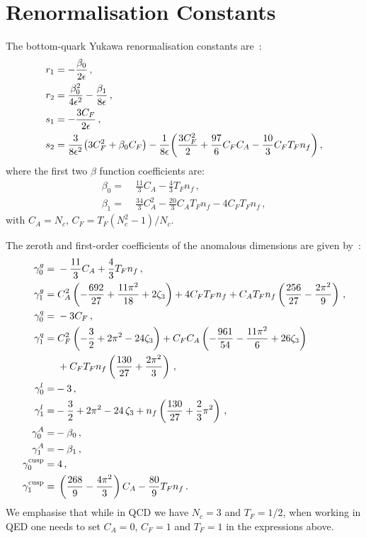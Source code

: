 \documentclass[main.tex]{subfiles}
\begin{document}
\chapter{Renormalisation Constants} \label{app:renormconstants}
The bottom-quark Yukawa renormalisation constants are~\cite{Ahmed:2014pka,Mondini:2021nck}:
\begin{align}
r_1 & = -\frac{\beta_0}{2\epsilon}\,, \\
r_2 & = \frac{\beta_0^2}{4\epsilon^2} - \frac{\beta_1}{8\epsilon}\,, \\
s_1 & = -\frac{3 C_F}{2\epsilon} \,, \\
s_2 & = \frac{3}{8\epsilon^2}\big(3 C_F^2 + \beta_0 C_F \big) - \frac{1}{8\epsilon} \bigg( \frac{3 C_F^2}{2} + \frac{97}{6} C_F C_A -\frac{10}{3} C_F T_F n_f   \bigg) \,,
\end{align}
where the first two $\beta$ function coefficients are:
\begin{align}
    \beta_0 = & \;\frac{11}{3}C_A - \frac{4}{3} T_F n_f \,, \\
    \beta_1 = & \; \frac{34}{3} C_A^2 - \frac{20}{3} C_A T_F n_f - 4 C_F T_F n_f \,,
\end{align}
with $C_A = N_c$, $C_F = T_F(N_c^2-1)/N_c$.

The zeroth and first-order coefficients of the anomalous dimensions are given by~\cite{Becher:2009qa}: 
\begingroup
\allowdisplaybreaks
\begin{align}
\gamma_0^g = & \; -\frac{11}{3}C_A + \frac{4}{3} T_F n_f \,,   \\
\gamma_1^g = & \;  C_A^2 \left( -\frac{692}{27} + \frac{11\pi^2}{18} + 2 \zeta_3\right)
               + 4 C_F T_F n_f
               + C_A T_F n_f \left( \frac{256}{27} - \frac{2\pi^2}{9}\right) \,, \\
\gamma_0^q = & \; -3 C_F \,, \\
\gamma_1^q = & \; C_F^2 \left( -\frac{3}{2} + 2 \pi^2 - 24 \zeta_3 \right)
                  + C_F C_A \left( -\frac{961}{54} -\frac{11\pi^2}{6} + 26 \zeta_3 \right) \nonumber \\ 
             & \;  + C_F T_F n_f \left( \frac{130}{27} + \frac{2\pi^2}{3} \right) \,, \\
\gamma^l_0 = & -3 \,, \\
\gamma^l_1 = & -\frac{3}{2}+2\pi^2-24 \, \zeta_3+n_f\left(\frac{130}{27}+\frac{2}{3}\pi^2\right) \,, \\
\gamma^A_0 = & -\beta_0 \,, \\
\gamma^A_1 = & -\beta_1 \,, \\
\gamma_0^{\mathrm{cusp}} = & \; 4 \,, \\
\gamma_1^{\mathrm{cusp}} = & \; \left( \frac{268}{9} - \frac{4\pi^2}{3} \right) C_A -\frac{80}{9} T_F n_f \,.
\end{align}
\endgroup
We emphasise that while in QCD we have $N_c=3$ and $T_F = 1/2$, when working in QED one needs to set $C_A=0$, $C_F=1$ and $T_F=1$ in the expressions above.
\end{document}
